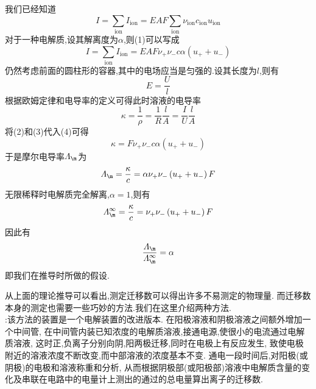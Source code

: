 \documentclass{ctexart}
\begin{document}
\begin{derivation}\setcounter{equation}{0}
    我们已经知道
    \begin{equation}
        I=\sum_{\text{ion}}I_{\text{ion}}=EAF\sum_{\text{ion}}\nu_{\text{ion}}c_{\text{ion}}u_{\text{ion}}
    \end{equation}
    对于一种电解质,设其解离度为$\alpha$,则(1)可以写成
    \begin{equation}
        I=\sum_{\text{ion}}I_{\text{ion}}=EAF\nu_+\nu_-c\alpha\left(u_++u_-\right)
    \end{equation}
    仍然考虑前面的圆柱形的容器,其中的电场应当是匀强的.设其长度为$l$,则有
    \begin{equation}
        E=\dfrac{U}{l}
    \end{equation}
    根据欧姆定律和电导率的定义可得此时溶液的电导率
    \begin{equation}
        \kappa=\dfrac{1}{\rho}=\dfrac{1}{R}\dfrac{l}{A}=\dfrac{I}{U}\dfrac{l}{A}
    \end{equation}
    将(2)和(3)代入(4)可得
    \begin{equation}
        \kappa=F\nu_+\nu_-c\alpha\left(u_++u_-\right)
    \end{equation}
    于是摩尔电导率$\varLambda_\m$为
    \begin{equation}
        \varLambda_\m=\dfrac{\kappa}{c}=\alpha\nu_+\nu_-\left(u_++u_-\right)F
    \end{equation}
    无限稀释时电解质完全解离,$\alpha=1$,则有
    \begin{equation}
        \varLambda_\m^\infty=\dfrac{\kappa}{c}=\nu_+\nu_-\left(u_++u_-\right)F
    \end{equation}
    因此有
    \begin{equation}
        \dfrac{\varLambda_\m}{\varLambda_\m^\infty}=\alpha
    \end{equation}
    即我们在推导时所做的假设.
\end{derivation}
\indent 从上面的理论推导可以看出,测定迁移数可以得出许多不易测定的物理量.%
而迁移数本身的测定也需要一些巧妙的方法.我们在这里介绍两种方法.\\
\indent{}:该方法的装置是一个电解装置的改进版本.%
在阳极溶液和阴极溶液之间额外增加一个中间管,%
在中间管内装已知浓度的电解质溶液,接通电源,使很小的电流通过电解质溶液,%
这时正,负离子分别向阴,阳两极迁移,同时在电极上有反应发生,%
致使电极附近的溶液浓度不断改变,而中部溶液的浓度基本不变.%
通电一段时间后,对阳极(或阴极)的电极和溶液称重和分析,%
从而根据阴极部(或阳极部)溶液中电解质含量的变化及串联在电路中的电量计上测出的通过的总电量算出离子的迁移数.\\
\end{document}
